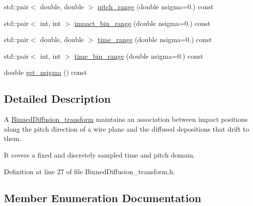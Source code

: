 \begin{DoxyCompactItemize}
\item 
std\+::pair$<$ double, double $>$ \hyperlink{class_wire_cell_1_1_gen_1_1_binned_diffusion__transform_a930b6511084f18a355737ca78cbc5bb8}{pitch\+\_\+range} (double nsigma=0.) const
\item 
std\+::pair$<$ int, int $>$ \hyperlink{class_wire_cell_1_1_gen_1_1_binned_diffusion__transform_acc55b5ad48ce4bc6081155bc9b3847aa}{impact\+\_\+bin\+\_\+range} (double nsigma=0.) const
\item 
std\+::pair$<$ double, double $>$ \hyperlink{class_wire_cell_1_1_gen_1_1_binned_diffusion__transform_a85b39e7bc1fde6350ee84c8a3407cada}{time\+\_\+range} (double nsigma=0.) const
\item 
std\+::pair$<$ int, int $>$ \hyperlink{class_wire_cell_1_1_gen_1_1_binned_diffusion__transform_a8c66fd61a47999c36c8b00cafbe3fb87}{time\+\_\+bin\+\_\+range} (double nsigma=0.) const
\item 
double \hyperlink{class_wire_cell_1_1_gen_1_1_binned_diffusion__transform_a34dcb68c70dcf99ff252e36442f4bce8}{get\+\_\+nsigma} () const
\end{DoxyCompactItemize}


\subsection{Detailed Description}
A \hyperlink{class_wire_cell_1_1_gen_1_1_binned_diffusion__transform}{Binned\+Diffusion\+\_\+transform} maintains an association between impact positions along the pitch direction of a wire plane and the diffused depositions that drift to them. \begin{DoxyVerb}It covers a fixed and discretely sampled time and pitch
domain.\end{DoxyVerb}
 

Definition at line 27 of file Binned\+Diffusion\+\_\+transform.\+h.



\subsection{Member Enumeration Documentation}
\mbox{\label{class_wire_cell_1_1_gen_1_1_binned_diffusion__transform_af412f1b73b13a90b066cb7284735ddf8}} 
